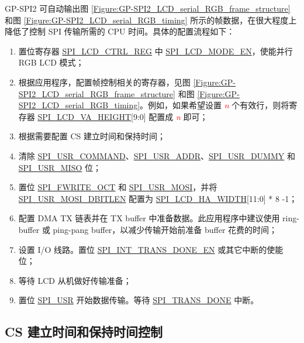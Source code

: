 \documentclass[main\_\_CN.tex]{subfiles}
\begin{document}
GP-SPI2 可自动输出图 \ref{Figure:GP-SPI2_LCD_serial_RGB_frame_structure} 和图 \ref{Figure:GP-SPI2_LCD_serial_RGB_timing} 所示的帧数据，在很大程度上降低了控制 SPI 传输所需的 CPU 时间。具体的配置流程如下：
\begin{enumerate}
    \item 置位寄存器 \hyperref[regdesc:SPILCDCTRLREG]{SPI\_LCD\_CTRL\_REG} 中 \hyperref[fielddesc:SPILCDMODEEN]{SPI\_LCD\_MODE\_EN}，使能并行 RGB LCD 模式；

    \item 根据应用程序，配置帧控制相关的寄存器，见图  \ref{Figure:GP-SPI2_LCD_serial_RGB_frame_structure} 和图  \ref{Figure:GP-SPI2_LCD_serial_RGB_timing}。例如，如果希望设置 \textcolor{red}{\it{n}} 个有效行，则将寄存器 \hyperref[fielddesc:SPILCDVAHEIGHT]{SPI\_LCD\_VA\_HEIGHT}[9:0] 配置成 \textcolor{red}{\it{n}} 即可；

    \item 根据需要配置 CS 建立时间和保持时间；

    \item 清除 \hyperref[fielddesc:SPIUSRCOMMAND]{SPI\_USR\_COMMAND}、\hyperref[fielddesc:SPIUSRADDR]{SPI\_USR\_ADDR}、\hyperref[fielddesc:SPIUSRDUMMY]{SPI\_USR\_DUMMY} 和 \hyperref[fielddesc:SPIUSRMISO]{SPI\_USR\_MISO} 位；

    \item 置位 \hyperref[fielddesc:SPIFWRITEOCT]{SPI\_FWRITE\_OCT} 和 \hyperref[fielddesc:SPIUSRMOSI]{SPI\_USR\_MOSI}，并将 \hyperref[fielddesc:SPIUSRMOSIDBITLEN]{SPI\_USR\_MOSI\_DBITLEN} 配置为 \hyperref[fielddesc:SPILCDHAWIDTH]{SPI\_LCD\_HA\_WIDTH}[11:0] * 8 -1；

    \item 配置 DMA TX 链表并在 TX buffer 中准备数据。此应用程序中建议使用 ring-buffer 或 ping-pang buffer，以减少传输开始前准备 buffer 花费的时间；

    \item 设置 I/O 线路。置位 \hyperref[fielddesc:SPIINTTRANSDONEEN]{SPI\_INT\_TRANS\_DONE\_EN} 或其它中断的使能位；

    \item 等待 LCD 从机做好传输准备；

    \item 置位 \hyperref[fielddesc:SPIUSR]{SPI\_USR} 开始数据传输。等待 \hyperref[fielddesc:SPITRANSDONE]{SPI\_TRANS\_DONE} 中断。
\end{enumerate}


\subsection{CS 建立时间和保持时间控制} \label{GP-SPI2 CS timing}
\end{document}
